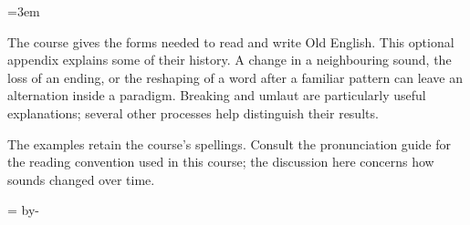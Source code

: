 \newcommand{\runningtitle}{Sound history}

\emergencystretch=3em
\newcommand{\reserve}[1]{\par\penalty-100\begingroup\dimen0=\pagegoal\advance\dimen0 by-\pagetotal\ifdim\dimen0<#1\newpage\fi\endgroup}

\raggedright
The course gives the forms needed to read and write Old English. This optional appendix explains some of their history. A change in a neighbouring sound, the loss of an ending, or the reshaping of a word after a familiar pattern can leave an alternation inside a paradigm. Breaking and umlaut are particularly useful explanations; several other processes help distinguish their results.\par
The examples retain the course’s spellings. Consult the pronunciation guide for the reading convention used in this course; the discussion here concerns how sounds changed over time.\par
\reserve{5\baselineskip}
